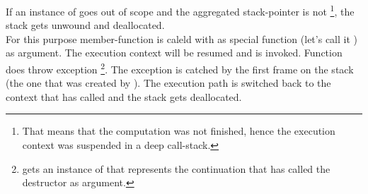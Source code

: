 
If an instance of \cont goes out of scope and the aggregated stack-pointer is
not \nullptr\footnote{That means that the computation was not finished, hence
the execution context was suspended in a deep call-stack.}, the stack gets
unwound and deallocated.\\
For this purpose member-function \resumewith is caleld with as special function
(let's call it \unwindfn) as argument. The execution context will be
resumed and \unwindfn is invoked. Function \unwindfn does throw exception
\unwindex\footnote{\unwindex gets an instance of \cont that represents the
continuation that has called the destructor as argument.}. The exception
is catched by the first frame on the stack (the one that was created by
\callcc). The execution path is switched back to the context that has called
 and the stack gets deallocated.


